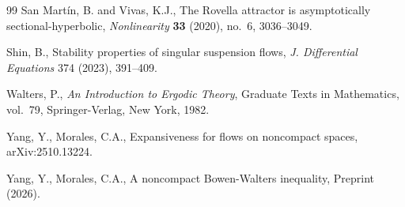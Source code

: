 \documentclass[11pt,reqno]{amsart}
\theoremstyle{definition}
\theoremstyle{remark}
\begin{document}
\begin{thebibliography}{99}
San Martín, B. and Vivas, K.J.,
The Rovella attractor is asymptotically sectional-hyperbolic,
\emph{Nonlinearity} \textbf{33} (2020), no.~6,
3036--3049.



Shin, B.,
Stability properties of singular suspension flows,
\emph{J. Differential Equations} 374 (2023), 391--409.



Walters, P.,
\emph{An Introduction to Ergodic Theory},
Graduate Texts in Mathematics, vol.~79, Springer-Verlag, New York, 1982.





Yang, Y., Morales, C.A.,
Expansiveness for flows on noncompact spaces,
arXiv:2510.13224.

Yang, Y., Morales, C.A.,
A noncompact Bowen-Walters inequality,
Preprint (2026).





\end{thebibliography}
\end{document}
